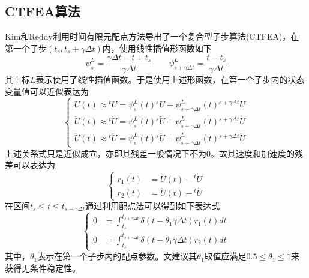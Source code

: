 \subsection{CTFEA算法}
Kim和Reddy利用时间有限元配点方法导出了一个复合型子步算法(CTFEA)\cite{Kim2016c}，在第一个子步$(t_s,t_s+\gamma\Delta t)$内，使用线性插值形函数如下
\begin{equation}
\psi_s^L=\frac{\gamma\Delta t-t+t_s}{\gamma\Delta t}\qquad \psi_{s+\gamma\Delta t}^L=\frac{t-t_s}{\gamma\Delta t}
\end{equation}
其上标$L$表示使用了线性插值函数。于是使用上述形函数，在第一个子步内的状态变量值可以近似表达为
\begin{equation}
\begin{cases}
U(t)\approx{^t\!U}=\psi_s^L(t){^s\!U}+\psi_{s+\gamma\Delta t}^L(t){^{s+\gamma\Delta t}\!U}\\
\dot{U}(t)\approx{^t\!\dot{U}}=\psi_s^L(t){^s\!\dot{U}}+\psi_{s+\gamma\Delta t}^L(t){^{s+\gamma\Delta t}\!\dot{U}}\\
\ddot{U}(t)\approx{^t\!\ddot{U}}=\psi_s^L(t){^s\!\ddot{U}}+\psi_{s+\gamma\Delta t}^L(t){^{s+\gamma\Delta t}\!\ddot{U}}
\end{cases}
\end{equation}
上述关系式只是近似成立，亦即其残差一般情况下不为0。故其速度和加速度的残差可以表达为
\begin{equation}
\begin{cases}
r_1(t)&=\dot{U}(t)-{^t\!\dot{U}}\\
r_2(t)&=\ddot{U}(t)-{^t\!\ddot{U}}
\end{cases}
\end{equation}
在区间$t_s\le t\le t_{s+\gamma\Delta t}$通过利用配点法可以得到如下表达式
\begin{equation}
\begin{cases}
0&=\int_{t_s}^{t_{s+\gamma\Delta t}}\delta(t-\theta_1\gamma\Delta t)r_1(t)dt\\
0&=\int_{t_s}^{t_{s+\gamma\Delta t}}\delta(t-\theta_1\gamma\Delta t)r_2(t)dt
\end{cases}
\end{equation}
其中，$\theta_1$表示在第一个子步内的配点参数。文建议其$\theta_1$取值应满足$0.5\le\theta_1\le1$来获得无条件稳定性。

